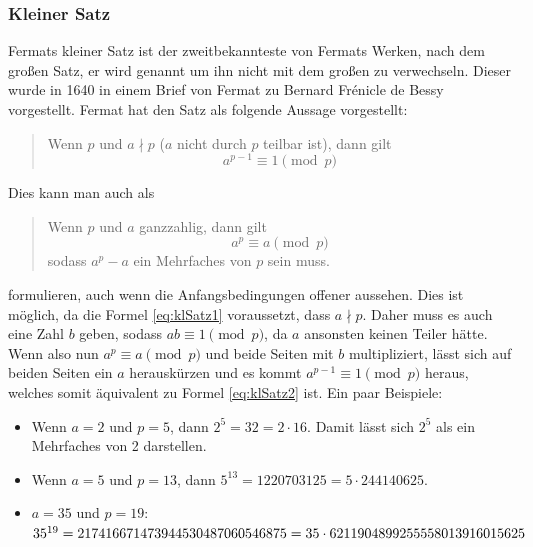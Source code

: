 \subsubsection{Kleiner Satz} \label{sec:klSatz}
Fermats kleiner Satz ist der zweitbekannteste von Fermats Werken, nach dem großen Satz, er wird  genannt um ihn nicht mit dem großen zu verwechseln. Dieser wurde in 1640 in einem Brief von Fermat zu Bernard Frénicle de Bessy vorgestellt. Fermat hat den Satz als folgende Aussage vorgestellt:

\begin{quote}
    Wenn $p$  und $a \nmid p$ ($a$ nicht durch $p$ teilbar ist), dann gilt
    \begin{equation} \label{eq:klSatz1}
        a^{p-1} \equiv 1 \pmod{p}
    \end{equation}
\end{quote}

Dies kann man auch als

\begin{quote}
    Wenn $p$  und $a$ ganzzahlig, dann gilt
    \begin{equation} \label{eq:klSatz2}
        a^p \equiv a \pmod{p}
    \end{equation}
    sodass $a^p - a$ ein Mehrfaches von $p$ sein muss.
\end{quote}

formulieren, auch wenn die Anfangsbedingungen offener aussehen. Dies ist möglich, da die Formel \ref{eq:klSatz1} voraussetzt, dass $a \nmid p$. Daher muss es auch eine Zahl $b$ geben, sodass $ab \equiv 1 \pmod{p}$, da $a$ ansonsten keinen Teiler hätte. Wenn also nun $a^p \equiv a \pmod{p}$ und beide Seiten mit $b$ multipliziert, lässt sich auf beiden Seiten ein $a$ herauskürzen und es kommt $a^{p-1} \equiv 1 \pmod{p}$ heraus, welches somit äquivalent zu Formel \ref{eq:klSatz2} ist. Ein paar Beispiele:

\begin{itemize}
    \item Wenn $a=2$ und $p=5$, dann $2^{5} = 32 = 2 \cdot 16$. Damit lässt sich $2^{5}$ als ein Mehrfaches von 2 darstellen.
    \item Wenn $a=5$ und $p=13$, dann $5^{13} = 1220703125 = 5 \cdot 244140625$.
    \item $a=35$ und $p=19$: \quad $35^{19} = 217416671473944530487060546875 \\ = 35 \cdot 6211904899255558013916015625$
\end{itemize}

